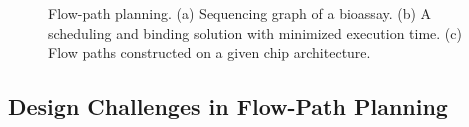 \begin{figure}[t]
    \centering
    \label{ta}
    \label{tb}
    \label{tc}
	  \caption{Flow-path planning. (a) Sequencing graph of a bioassay. (b) A scheduling and binding solution with minimized execution time. (c) Flow paths constructed on a given chip architecture.}
	  \label{fig:motivation}
\vspace{-0.5cm}
\end{figure}

\subsection{Design Challenges in Flow-Path Planning}\label{sec:flow_path_chan}

